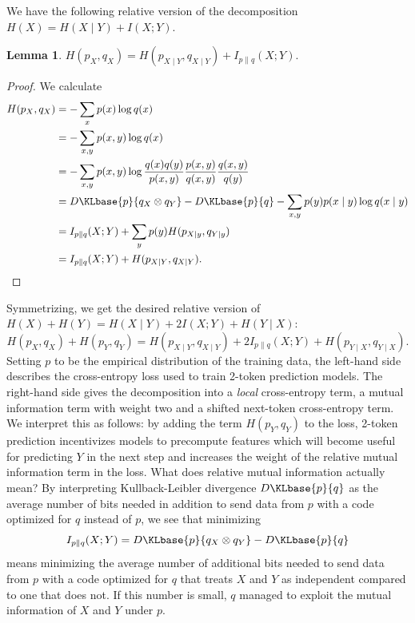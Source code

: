 \documentclass{article}
\newcommand{\KL}{D\KLbase}
\theoremstyle{plain}
\newtheorem{lemma}[theorem]{Lemma}
\theoremstyle{definition}
\theoremstyle{remark}
\begin{document}
We have the following relative version of the decomposition $H(X) = H(X \mid Y) + I(X; Y)$.
\begin{lemma}
    $H(p_X, q_X) = H(p_{X \mid Y}, q_{X \mid Y}) + I_{p \| q}(X; Y).$
\end{lemma}
\begin{proof}
We calculate
\begin{align*}
    H(p_X, q_X)
    &= -\sum_x p(x) \log q(x) \\
    &= -\sum_{x,y} p(x, y) \log q(x) \\
    &= -\sum_{x,y} p(x, y) \log \frac{q(x)q(y)}{p(x, y)}\frac{p(x, y)}{q(x, y)}\frac{q(x, y)}{q(y)}  \\
    &= \KL{p}{q_X \otimes q_Y} - \KL{p}{q} - \sum_{x,y} p(y) p(x \mid y) \log q(x \mid y) \\
    &= I_{p \| q}(X; Y) + \sum_y p(y) H(p_{X\mid y}, q_{Y\mid y}) \\
    &= I_{p \| q}(X; Y) + H(p_{X \mid Y}, q_{X \mid Y}).
\end{align*}
\end{proof}
Symmetrizing, we get the desired relative version of $H(X) + H(Y) = H(X \mid Y) + 2 I(X; Y) + H(Y \mid X)$:
\[
    H(p_X, q_X) + H(p_Y, q_Y)
    = H(p_{X \mid Y}, q_{X \mid Y}) + 2 I_{p \| q}(X; Y) + H(p_{Y \mid X}, q_{Y \mid X}).
\]
Setting $p$ to be the empirical distribution of the training data, the left-hand side describes the cross-entropy loss used to train 2-token prediction models. The right-hand side gives the decomposition into a \emph{local} cross-entropy term, a mutual information term with weight two and a shifted next-token cross-entropy term. We interpret this as follows: by adding the term $H(p_Y, q_Y)$ to the loss, 2-token prediction incentivizes models to precompute features which will become useful for predicting $Y$ in the next step and increases the weight of the relative mutual information term in the loss. What does relative mutual information actually mean? By interpreting Kullback-Leibler divergence $\KL{p}{q}$ as the average number of bits needed in addition to send data from $p$ with a code optimized for $q$ instead of $p$, we see that minimizing
\[
I_{p \| q}(X; Y) = \KL{p}{q_X \otimes q_Y} - \KL{p}{q}
\]
means minimizing the average number of additional bits needed to send data from $p$ with a code optimized for $q$ that treats $X$ and $Y$ as independent compared to one that does not. If this number is small, $q$ managed to exploit the mutual information of $X$ and $Y$ under $p$.
\end{document}
